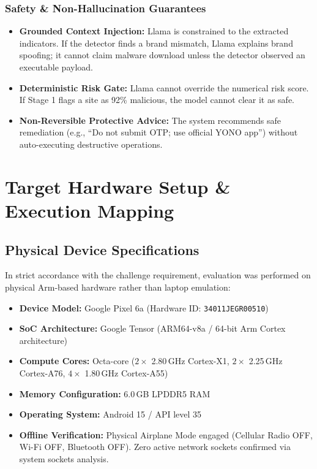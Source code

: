\documentclass[11pt,a4paper]{article}
\begin{document}
\subsubsection{Safety \& Non-Hallucination Guarantees}
\begin{itemize}
    \item \textbf{Grounded Context Injection:} Llama is constrained to the extracted indicators. If the detector finds a brand mismatch, Llama explains brand spoofing; it cannot claim malware download unless the detector observed an executable payload.
    \item \textbf{Deterministic Risk Gate:} Llama cannot override the numerical risk score. If Stage 1 flags a site as 92\% malicious, the model cannot clear it as safe.
    \item \textbf{Non-Reversible Protective Advice:} The system recommends safe remediation (e.g., ``Do not submit OTP; use official YONO app'') without auto-executing destructive operations.
\end{itemize}

\section{Target Hardware Setup \& Execution Mapping}

\subsection{Physical Device Specifications}
In strict accordance with the challenge requirement, evaluation was performed on physical Arm-based hardware rather than laptop emulation:
\begin{itemize}
    \item \textbf{Device Model:} Google Pixel 6a (Hardware ID: \texttt{34011JEGR00510})
    \item \textbf{SoC Architecture:} Google Tensor (ARM64-v8a / 64-bit Arm Cortex architecture)
    \item \textbf{Compute Cores:} Octa-core ($2\times$ 2.80\,GHz Cortex-X1, $2\times$ 2.25\,GHz Cortex-A76, $4\times$ 1.80\,GHz Cortex-A55)
    \item \textbf{Memory Configuration:} 6.0\,GB LPDDR5 RAM
    \item \textbf{Operating System:} Android 15 / API level 35
    \item \textbf{Offline Verification:} Physical Airplane Mode engaged (Cellular Radio OFF, Wi-Fi OFF, Bluetooth OFF). Zero active network sockets confirmed via system sockets analysis.
\end{itemize}
\end{document}
